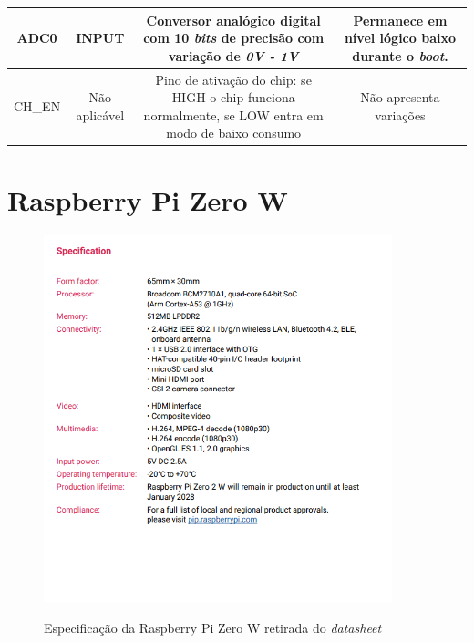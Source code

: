 \begin{anexosenv}
\begin{center}
\begin{longtable}{c|c|c|c}
		ADC0 & INPUT & \multicolumn{1}{m{5cm}|}{Conversor analógico digital com 10 \textit{bits} de precisão com variação de \textit{0V - 1V}} & \multicolumn{1}{m{4cm}}{Permanece em nível lógico baixo durante o \textit{boot}.}\\ \hline
		
		 CH\_EN & Não aplicável & \multicolumn{1}{m{5cm}|}{Pino de ativação do chip: se HIGH o chip funciona normalmente, se LOW entra em modo de baixo consumo} & \multicolumn{1}{m{4cm}}{Não apresenta variações}\\ \hline
	
	\end{longtable}
	
\end{center}




\chapter{Raspberry Pi Zero W}
\label{chap:anexoB}

\begin{figure}[H]
	\centering
	\caption{Especificação da Raspberry Pi Zero W retirada do \textit{datasheet}}
	\includegraphics[width=0.9\textwidth]{figuras/especificacao_raps.png}
	\label{fig:especificacao_raspberry}
\end{figure} 




\end{anexosenv}
